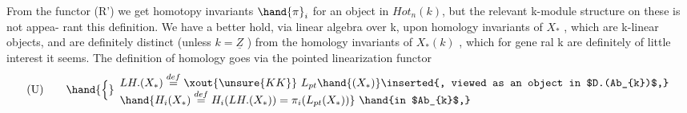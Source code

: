 From the  functor  (R')  we get homotopy invariants  $\hand{\pi}_{i}$ for an object
in  $Hot_{n}(k)$,  but the relevant k-module structure on these is not appea-%
rant  this definition.  We have a better hold,  via linear algebra over
k,  upon  homology invariants of $X_{*}$  ,  which are k-linear objects,  and
are definitely distinct (unless $k=\underline{Z}$ )  from the homology invariants of
$X_{*}(k)$ ,  which for gene ral k are definitely of little interest it seems.
The definition of homology goes via the pointed linearization functor \hand{:}
\[ \text{(U)} \qquad \hand{\Big\{} \begin{array}{l} LH.(X_{*}) \overset{def}{=} \xout{\unsure{KK}} \ L_{pt}\hand{(X_{*})} \inserted{, viewed as an object in $D.(Ab_{k})$,} \\ \hand{H_{i}(X_{*}) \overset{def}{=} H_{i}(LH.(X_{*})) = \pi_{i}(L_{pt}(X_{*}))} \ \hand{in $Ab_{k}$,} \end{array} \]
